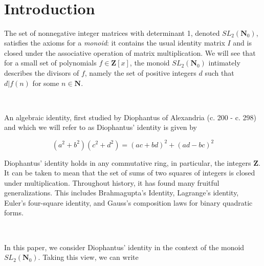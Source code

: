 \documentclass{article}
\begin{document}
\begin{abstract}
Sequences with analogous properties are given for all enumerable polynomials in Section~\ref{section_summary}. Informally, these sequences encode the divisor structure of their respective polynomials. Property $(3)$ makes $\mathcal{S}$ amenable to the asymptotic analysis of $k$-regular sequences, an area which has undergone significant development in recent years.
\end{abstract}

\

\

\

\

\

\

\

\

\

\

\tableofcontents

\

\section{Introduction}\label{section_intro}

The set of nonnegative integer matrices with determinant 1, denoted $SL_2(\mathbf{N}_0)$, satisfies the axioms for a \textit{monoid}: 
it contains the usual identity matrix $I$ and is closed under the associative operation of matrix multiplication. We will see that for a small set of polynomials $f \in \mathbf{Z}[x]$, the monoid $SL_2(\mathbf{N}_0)$ intimately describes the divisors of $f$, namely the set of positive integers $d$ such that $d \lvert f(n)$ for some $n \in \mathbf{N}$.

\

An algebraic identity, first studied by Diophantus of Alexandria (c. 200 - c. 298) and which we will refer to as Diophantus' identity is given by

$$(a^2 + b^2)(c^2 + d^2) = (ac+bd)^2 + (ad-bc)^2$$

Diophantus' identity holds in any commutative ring, in particular, the integers $\mathbf{Z}$. It can be taken to mean that the set of sums of two squares of integers is closed under multiplication. Throughout history, it has found many fruitful generalizations. This includes Brahmagupta's Identity, Lagrange's identity, Euler's four-square identity, and Gauss's composition laws for binary quadratic forms.

\

In this paper, we consider Diophantus' identity in the context of the monoid $SL_2(\mathbf{N}_0)$. Taking this view, we can write
\end{document}
